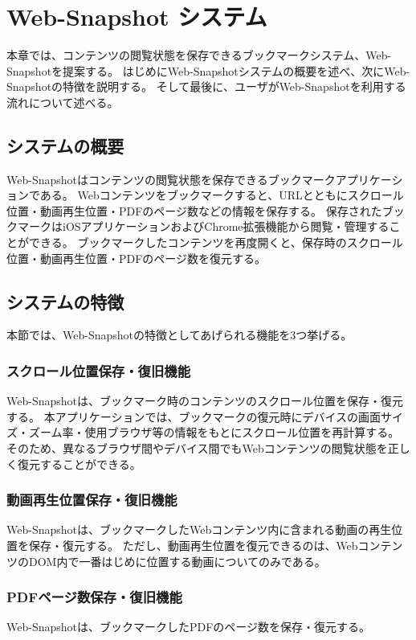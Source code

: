 \chapter{Web-Snapshot システム}
\label{chap:web_snapshot_system}
本章では、コンテンツの閲覧状態を保存できるブックマークシステム、Web-Snapshotを提案する。
はじめにWeb-Snapshotシステムの概要を述べ、次にWeb-Snapshotの特徴を説明する。
そして最後に、ユーザがWeb-Snapshotを利用する流れについて述べる。

\section{システムの概要}
Web-Snapshotはコンテンツの閲覧状態を保存できるブックマークアプリケーションである。
Webコンテンツをブックマークすると、URLとともにスクロール位置・動画再生位置・PDFのページ数などの情報を保存する。
保存されたブックマークはiOSアプリケーションおよびChrome拡張機能から閲覧・管理することができる。
ブックマークしたコンテンツを再度開くと、保存時のスクロール位置・動画再生位置・PDFのページ数を復元する。

\section{システムの特徴}
本節では、Web-Snapshotの特徴としてあげられる機能を3つ挙げる。

\subsection{スクロール位置保存・復旧機能}
Web-Snapshotは、ブックマーク時のコンテンツのスクロール位置を保存・復元する。
本アプリケーションでは、ブックマークの復元時にデバイスの画面サイズ・ズーム率・使用ブラウザ等の情報をもとにスクロール位置を再計算する。
そのため、異なるブラウザ間やデバイス間でもWebコンテンツの閲覧状態を正しく復元することができる。

\subsection{動画再生位置保存・復旧機能}
Web-Snapshotは、ブックマークしたWebコンテンツ内に含まれる動画の再生位置を保存・復元する。
ただし、動画再生位置を復元できるのは、WebコンテンツのDOM内で一番はじめに位置する動画についてのみである。

\subsection{PDFページ数保存・復旧機能}
Web-Snapshotは、ブックマークしたPDFのページ数を保存・復元する。

